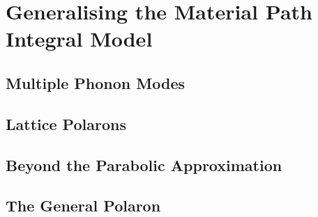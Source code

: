 \chapter{Generalising the Material Path Integral Model}
\label{chap:third}



\section{Multiple Phonon Modes}
\label{sec:chap-third-first}

\section{Lattice Polarons}
\label{sec:chap-third-second}

\section{Beyond the Parabolic Approximation}
\label{sec:chap-third-third}

\section{The General Polaron}
\label{sec:chap-third-fourth}
